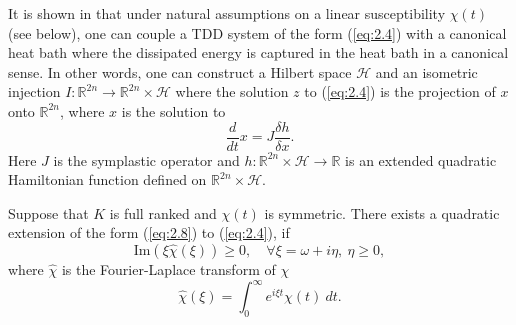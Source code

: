 It is shown in \cite{Figotin:2006jy,Figotin:2005} that under natural assumptions on a linear susceptibility $\chi(t)$ (see below), one can couple a TDD system of the form (\ref{eq:2.4}) with a canonical heat bath where the dissipated energy is captured in the heat bath in a canonical sense. In other words, one can construct a Hilbert space $\mathcal H$ and an isometric injection $I:\mathbb R^{2n} \to \mathbb R^{2n}\times \mathcal H$ where the solution $z$ to (\ref{eq:2.4}) is the projection of $x$ onto $\mathbb R^{2n}$, where $x$ is the solution to
\begin{equation} \label{eq:2.7}
	\frac{d}{dt} x = J \frac{\delta h}{\delta x}.
\end{equation}
Here $J$ is the symplastic operator and $h:\mathbb R^{2n}\times \mathcal H \to \mathbb R$ is an extended quadratic Hamiltonian function defined on $\mathbb R^{2n}\times \mathcal H$.

\begin{theorem}
Suppose that $K$ is full ranked and $\chi(t)$ is symmetric. There exists a quadratic extension of the form (\ref{eq:2.8}) to (\ref{eq:2.4}), if
\begin{equation} \label{eq:2.8}
	\text{Im}(\xi\hat{\chi}(\xi)) \geq 0, \quad \forall \xi = \omega + i\eta, \ \eta \geq 0,
\end{equation}
where $\hat{\chi}$ is the Fourier-Laplace transform of $\chi$
\begin{equation} \label{eq:2.9}
	\hat{\chi}(\xi) = \int_0^\infty e^{i\xi t} \chi(t)\ dt.
\end{equation}
\end{theorem}


